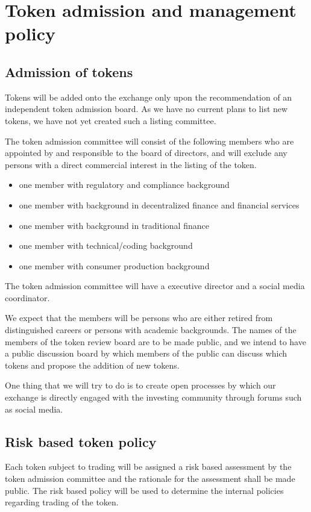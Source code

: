 \chapter{Token admission and management policy}

\section{Admission of tokens}

Tokens will be added onto the exchange only upon the recommendation of
an independent token admission board.  As we have no current plans to
list new tokens, we have not yet created such a listing committee.

The token admission committee will consist of the following members
who are appointed by and responsible to the board of directors, and
will exclude any persons with a direct commercial interest in the
listing of the token.

\begin{itemize}
  \item one member with regulatory and compliance background
  \item one member with background in decentralized finance and
    financial services
  \item one member with background in traditional finance
  \item one member with technical/coding background
  \item one member with consumer production background
\end{itemize}

The token admission committee will have a executive director and a
social media coordinator.

We expect that the members will be persons who are either retired from
distinguished careers or persons with academic backgrounds.  The names
of the members of the token review board are to be made public, and we
intend to have a public discussion board by which members of the
public can discuss which tokens and propose the addition of new
tokens.

One thing that we will try to do is to create open processes by which
our exchange is directly engaged with the investing community through
forums such as social media.

\section{Risk based token policy}
Each token subject to trading will be assigned a risk based assessment
by the token admission committee and the rationale for the assessment
shall be made public.  The risk based policy will be used to determine
the internal policies regarding trading of the token.

